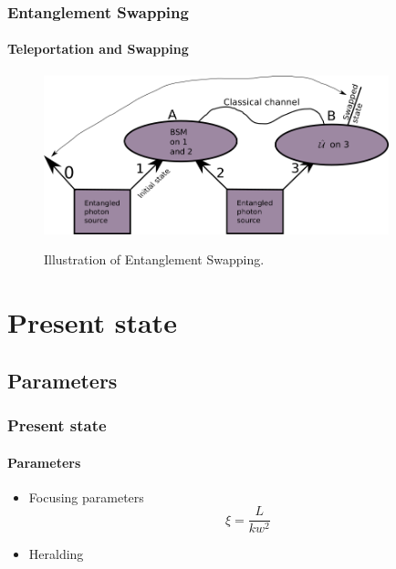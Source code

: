 \documentclass[serif,8pt]{beamer}
\begin{document}
{{\addtocounter{framenumber}{-1}
\begin{frame}[t]
    \frametitle{Entanglement Swapping}
    \framesubtitle{Teleportation and Swapping}
\begin{figure}[]
      \centering
      \caption{Illustration of Entanglement Swapping.}
      \includegraphics[width=10cm]{EntanglementSwapping.png}
      \label{fig:Swap}
    \end{figure}
\end{frame}

\section{Present state}

\subsection{Parameters}
\begin{frame}[t]
	\frametitle{Present state}
	\framesubtitle{Parameters}
		\begin{itemize}
			\item Focusing parameters \cite{bennik}
					\begin{equation}
							\xi = \frac{L}{k w^2}
						\label{eq:Focusing parameter}
					\end{equation}
			\item Heralding
		\end{itemize}
\end{frame}

}}
\end{document}
